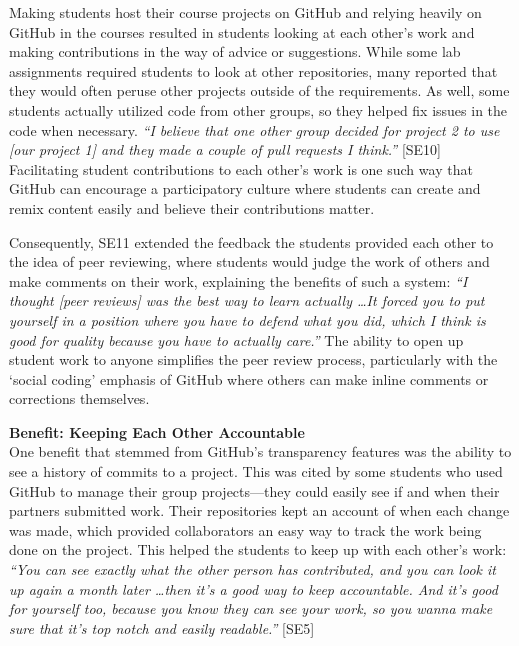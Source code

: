 Making students host their course projects on GitHub and relying heavily on GitHub in the courses resulted in students looking at each other's work and making contributions in the way of advice or suggestions. While some lab assignments required students to look at other repositories, many reported that they would often peruse other projects outside of the requirements. As well, some students actually utilized code from other groups, so they helped fix issues in the code when necessary. \textit{``I believe that one other group decided for project 2 to use [our project 1] and they made a couple of pull requests I think.''} [SE10] Facilitating student contributions to each other's work is one such way that GitHub can encourage a participatory culture \cite{jenkins2009confronting} where students can create and remix content easily and believe their contributions matter.

Consequently, SE11 extended the feedback the students provided each other to the idea of peer reviewing, where students would judge the work of others and make comments on their work, explaining the benefits of such a system: \textit{``I thought [peer reviews] was the best way to learn actually \ldots It forced you to put yourself in a position where you have to defend what you did, which I think is good for quality because you have to actually care.''} The ability to open up student work to anyone simplifies the peer review process, particularly with the `social coding' emphasis of GitHub where others can make inline comments or corrections themselves.


\textbf{Benefit: Keeping Each Other Accountable} \\
One benefit that stemmed from GitHub's transparency features was the ability to see a history of commits to a project. This was cited by some students who used GitHub to manage their group projects---they could easily see if and when their partners submitted work. Their repositories kept an account of when each change was made, which provided collaborators an easy way to track the work being done on the project. This helped the students to keep up with each other's work: \textit{``You can see exactly what the other person has contributed, and you can look it up again a month later \ldots then it's a good way to keep accountable. And it's good for yourself too, because you know they can see your work, so you wanna make sure that it's top notch and easily readable.''} [SE5]

